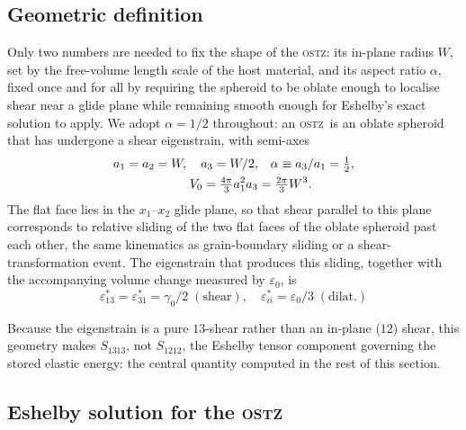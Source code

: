 \documentclass[3p]{elsarticle}
\newcommand{\OSTZ}{\textsc{ostz}}
\newcommand{\gz}{\gamma_0}
\begin{document}
\subsection{Geometric definition}
\label{sec:geometry}

Only two numbers are needed to fix the shape of the \OSTZ: its
in-plane radius $W$, set by the free-volume length scale of the
host material, and its aspect ratio $\alpha$, fixed once and for all
by requiring the spheroid to be oblate enough to localise shear near
a glide plane while remaining smooth enough for Eshelby's exact
solution to apply. We adopt $\alpha=1/2$ throughout: an \OSTZ\ is an
oblate spheroid that has undergone a shear eigenstrain, with
semi-axes
\begin{align}
  a_1=a_2=W,\quad a_3=W/2,&\quad \alpha\equiv a_3/a_1=\tfrac{1}{2},
  \notag\\
  V_0=\tfrac{4\pi}{3}a_1^2 a_3&=\tfrac{2\pi}{3}W^3.
  \label{eq:geometry}
\end{align}
The flat face lies in the $x_1$--$x_2$ glide plane, so that shear
parallel to this plane corresponds to relative sliding of the two
flat faces of the oblate spheroid past each other, the same kinematics
as grain-boundary sliding or a shear-transformation event. The
eigenstrain that produces this sliding, together with the
accompanying volume change measured by $\varepsilon_0$, is
\begin{equation}
  \varepsilon^*_{13}=\varepsilon^*_{31}=\gz/2\;(\text{shear}),\quad
  \varepsilon^*_{ii}=\varepsilon_0/3\;(\text{dilat.})
  \label{eq:eigenstrain}
\end{equation}

Because the eigenstrain is a pure $13$-shear rather than an in-plane
($12$) shear, this geometry makes $S_{1313}$, not $S_{1212}$, the
Eshelby tensor component governing the stored elastic energy:
the central quantity computed in the rest of this section.

\subsection{Eshelby solution for the \OSTZ}
\label{sec:eshelby}
\end{document}
